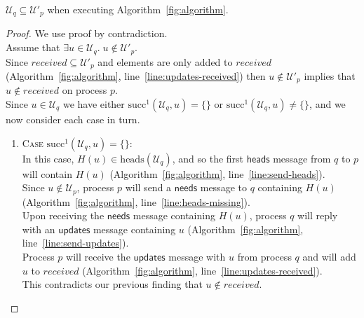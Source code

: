 \documentclass[a4paper,anonymous,USenglish]{lipics-v2019}
\begin{document}
\begin{lemma}\label{lemma:no-q-missing}
$\mathcal{U}_q \subseteq \mathcal{U}'_p$ when executing Algorithm~\ref{fig:algorithm}.
\end{lemma}
\begin{proof}
We use proof by contradiction.\\
Assume that $\exists u \in \mathcal{U}_q.\; u \notin  \mathcal{U}'_p$.\\
Since $\mathit{received} \subseteq \mathcal{U}'_p$ and elements are only added to $\mathit{received}$ (Algorithm~\ref{fig:algorithm}, line~\ref{line:updates-received}) then $u \notin  \mathcal{U}'_p$ implies that $u \notin \mathit{received}$ on process $p$.\\
Since $u \in \mathcal{U}_q$ we have either $\mathrm{succ}^1(\mathcal{U}_q, u) = \{\}$ or $\mathrm{succ}^1(\mathcal{U}_q, u) \ne \{\}$, and we now consider each case in turn.
\begin{enumerate}
    \item\textsc{Case} $\mathrm{succ}^1(\mathcal{U}_q, u) = \{\}$:\\
    In this case, $H(u) \in \mathrm{heads}(\mathcal{U}_q)$, and so the first $\mathsf{heads}$ message from $q$ to $p$ will contain $H(u)$ (Algorithm~\ref{fig:algorithm}, line~\ref{line:send-heads}).\\
    Since $u \notin \mathcal{U}_p$, process $p$ will send a $\mathsf{needs}$ message to $q$ containing $H(u)$ (Algorithm~\ref{fig:algorithm}, line~\ref{line:heads-missing}).\\
    Upon receiving the $\mathsf{needs}$ message containing $H(u)$, process $q$ will reply with an $\mathsf{updates}$ message containing $u$ (Algorithm~\ref{fig:algorithm}, line~\ref{line:send-updates}).\\
    Process $p$ will receive the $\mathsf{updates}$ message with $u$ from process $q$ and will add $u$ to $\mathit{received}$ (Algorithm~\ref{fig:algorithm}, line~\ref{line:updates-received}).\\
    This contradicts our previous finding that $u \notin \mathit{received}$.
    

\end{enumerate}
\end{proof}
\end{document}
